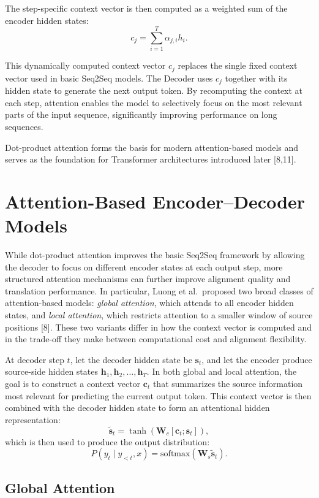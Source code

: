 \documentclass{article}
\renewcommand{\cite}[1]{[#1]}
\begin{document}
The step-specific context vector is then computed as a weighted sum of the encoder hidden states:
\[
c_j = \sum_{i=1}^{T} \alpha_{j,i} h_i.
\]

This dynamically computed context vector \( c_j \) replaces the single fixed context vector used in basic Seq2Seq models. The Decoder uses \( c_j \) together with its hidden state to generate the next output token. By recomputing the context at each step, attention enables the model to selectively focus on the most relevant parts of the input sequence, significantly improving performance on long sequences.

Dot-product attention forms the basis for modern attention-based models and serves as the foundation for Transformer architectures introduced later \cite{8,11}.

\section{Attention-Based Encoder--Decoder Models}

While dot-product attention improves the basic Seq2Seq framework by allowing the decoder to focus on different encoder states at each output step, more structured attention mechanisms can further improve alignment quality and translation performance. In particular, Luong et al.\ proposed two broad classes of attention-based models: \emph{global attention}, which attends to all encoder hidden states, and \emph{local attention}, which restricts attention to a smaller window of source positions \cite{8}. These two variants differ in how the context vector is computed and in the trade-off they make between computational cost and alignment flexibility.

At decoder step \(t\), let the decoder hidden state be \(\mathbf{s}_t\), and let the encoder produce source-side hidden states \(\mathbf{h}_1, \mathbf{h}_2, \dots, \mathbf{h}_T\). In both global and local attention, the goal is to construct a context vector \(\mathbf{c}_t\) that summarizes the source information most relevant for predicting the current output token. This context vector is then combined with the decoder hidden state to form an attentional hidden representation:
\[
\tilde{\mathbf{s}}_t = \tanh\!\left(\mathbf{W}_c[\mathbf{c}_t;\mathbf{s}_t]\right),
\]
which is then used to produce the output distribution:
\[
P(y_t \mid y_{<t}, x) = \text{softmax}(\mathbf{W}_s \tilde{\mathbf{s}}_t).
\]

\subsection{Global Attention}
\end{document}
